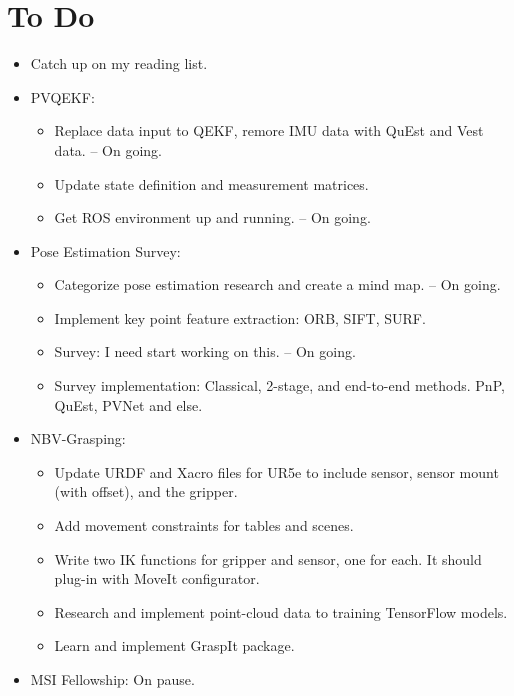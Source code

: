 \documentclass[11pt]{article}
\begin{document}
\section{To Do}
\begin{itemize}
  \item Catch up on my reading list.
  \item PVQEKF:
  \begin{itemize}
      \item Replace data input to QEKF, remore IMU data with QuEst and Vest data. -- On going.
      \item Update state definition and measurement matrices.
      \item Get ROS environment up and running. -- On going.
  \end{itemize}
  \item Pose Estimation Survey:
  \begin{itemize}
      \item Categorize pose estimation research and create a mind map. -- On going.
      \item Implement key point feature extraction: ORB, SIFT, SURF.
      \item Survey: I need start working on this. -- On going.
      \item Survey implementation: Classical, 2-stage, and end-to-end methods. PnP, QuEst, PVNet and else.
  \end{itemize}
  \item NBV-Grasping:
      \begin{itemize}
      \item Update URDF and Xacro files for UR5e to include sensor, sensor mount (with offset), and the gripper.
      \item Add movement constraints for tables and scenes.
      \item Write two IK functions for gripper and sensor, one for each. It should plug-in with MoveIt configurator.
      \item Research and implement point-cloud data to training TensorFlow models.
      \item Learn and implement GraspIt package.
      \end{itemize}
  \item MSI Fellowship: On pause.
\end{itemize}
\end{document}
